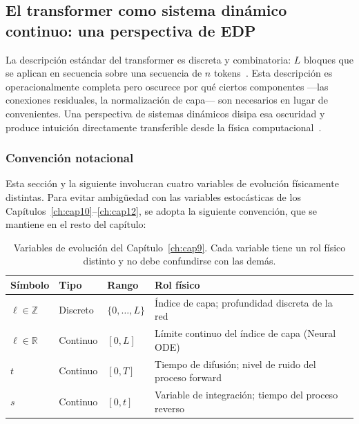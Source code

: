\subsection{El transformer como sistema dinámico continuo:
            una perspectiva de EDP}
\label{subsec:transformer_pde}

La descripción estándar del transformer es discreta y combinatoria:
$L$ bloques que se aplican en secuencia sobre una secuencia de $n$
tokens~\cite{vaswani2017attention}. Esta descripción es operacionalmente
completa pero oscurece por qué ciertos componentes —las conexiones
residuales, la normalización de capa— son necesarios en lugar de
convenientes. Una perspectiva de sistemas dinámicos disipa esa
oscuridad y produce intuición directamente transferible desde la
física computacional~\cite{transformer_pde_2024}.

\subsubsection*{Convención notacional}

Esta sección y la siguiente involucran cuatro variables de evolución
físicamente distintas. Para evitar ambigüedad con las variables
estocásticas de los Capítulos~\ref{ch:cap10}--\ref{ch:cap12}, se
adopta la siguiente convención, que se mantiene en el resto del
capítulo:

\begin{table}[h]
\centering
\caption{Variables de evolución del Capítulo~\ref{ch:cap9}.
         Cada variable tiene un rol físico distinto
         y no debe confundirse con las demás.}
\label{tab:notacion_evolucion}
\small
\begin{tabular}{llll}
\toprule
\textbf{Símbolo} & \textbf{Tipo} & \textbf{Rango} &
\textbf{Rol físico} \\
\midrule
$\ell \in \mathbb{Z}$ & Discreto & $\{0,\ldots,L\}$ &
  Índice de capa; profundidad discreta de la red \\
$\ell \in \mathbb{R}$ & Continuo & $[0,L]$ &
  Límite continuo del índice de capa (Neural ODE) \\
$t$ & Continuo & $[0,T]$ &
  Tiempo de difusión; nivel de ruido del proceso forward \\
$s$ & Continuo & $[0,t]$ &
  Variable de integración; tiempo del proceso reverso \\
\bottomrule
\end{tabular}
\end{table}

